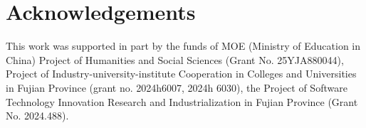 \documentclass[a4paper]{cas-dc}
\begin{document}
		
		
%		
		
		\section*{Acknowledgements}
		This work was supported in part by the funds of MOE (Ministry of Education in China) Project of Humanities and Social Sciences (Grant No. 25YJA880044), Project of Industry-university-institute Cooperation in Colleges and Universities in Fujian Province (grant no. 2024h6007, 2024h
		6030), the Project of Software Technology Innovation Research and Industrialization in Fujian Province (Grant No. 2024.488).
		
		
		
\end{document}
